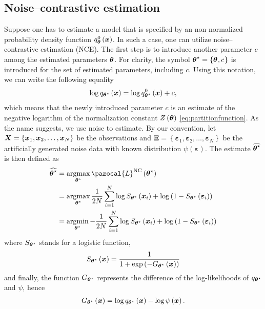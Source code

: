 \subsection{Noise--contrastive estimation}
Suppose one has to estimate a model that is specified by an non-normalized probability density function $q^0_{\boldsymbol{\theta}}\left(\boldsymbol{x}\right)$. In such a case, one can utilize noise--contrastive estimation (NCE). The first step is to introduce another parameter $c$ among the estimated parameters $\boldsymbol{\theta}$. For clarity, the symbol $\boldsymbol{\theta}^\star=\left\lbrace\boldsymbol{\theta}^{},c^{}_{}\right\rbrace$ is introduced for the set of estimated parameters, including
$c$. Using this notation, we can write the following equality
\begin{align}
    \log q_{\boldsymbol{\theta}^\star}\left(\boldsymbol{x}\right) = \log q_{\boldsymbol{\theta}^\star}^0\left(\boldsymbol{x}\right) + c,
    \end{align}
which means that the newly introduced parameter $c$ is an estimate of the negative logarithm of
the normalization constant $Z\left(\boldsymbol{\theta}\right)$ \eqref{eq:partitionfunction}.
As the name suggests, we use noise to estimate. By our convention, let $\boldsymbol{X} = \left\lbrace\boldsymbol{x}_1,\boldsymbol{x}_2,\dots,\boldsymbol{x}_N\right\rbrace$
be the observations and $\boldsymbol{\Xi} = \left\lbrace\boldsymbol{\varepsilon}_1,\boldsymbol{\varepsilon}_2,\dots,\boldsymbol{\varepsilon}_N\right\rbrace$ be the artificially generated noise data with known distribution $\psi\left(\boldsymbol{\varepsilon}\right)$. The estimate $\widehat{\boldsymbol{\theta}^\star}$ is then defined as
\begin{align}
    \widehat{\bt^\star} &= \argmax_{\bt^\star} \pazocal{L}^{\mathrm{NC}}\left(\bt^\star\right)\\
   &= \argmax_{\bt^\star} \frac{1}{2N}\sum_{i=1}^N \log S_{\bt^\star}\left(\bx_i\right) + \log\left(1-S_{\bt^\star}\left(\boldsymbol{\varepsilon}_i\right) \right)\label{NCEloss1}\\
   &= \argmin_{\bt^\star} -\frac{1}{2N}\sum_{i=1}^N \log S_{\bt^\star}\left(\bx_i\right) + \log\left(1-S_{\bt^\star}\left(\boldsymbol{\varepsilon}_i\right) \right)\label{NCEloss2}
\end{align}
where $S_{\boldsymbol{\theta}^\star}$ stands for a logistic function,
\begin{align}
S_{\boldsymbol{\theta}^\star}\left(\boldsymbol{x}\right) = \frac{1}{1 + \exp\left(-G_{\boldsymbol{\theta}^\star}\left(\boldsymbol{x}\right) \right)}
\end{align}
and finally, the function $G_{\boldsymbol{\theta}^\star}$ represents the difference of the log-likelihoods of $q_{\boldsymbol{\theta}^\star}$ and $\psi$, hence 
\begin{align}\label{eq:NCE_G}
    G_{\boldsymbol{\theta}^\star}\left(\boldsymbol{x}\right) = \log q_{\boldsymbol{\theta}^\star}\left(\boldsymbol{x} \right) - \log\psi\left(\boldsymbol{x} \right).
\end{align}

